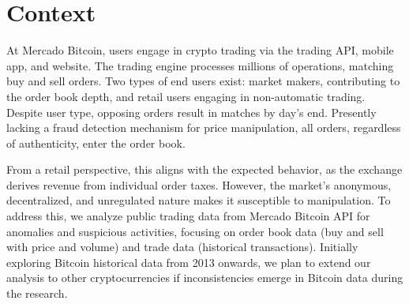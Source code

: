 \section{Context}
At Mercado Bitcoin, users engage in crypto trading via the trading API, mobile app, and website. The trading engine
processes millions of operations, matching buy and sell orders. Two types of end users exist: market makers,
contributing to the order book depth, and retail users engaging in non-automatic trading. Despite user type, opposing
orders result in matches by day's end. Presently lacking a fraud detection mechanism for price manipulation, all orders,
regardless of authenticity, enter the order book.

From a retail perspective, this aligns with the expected behavior, as the exchange derives revenue from individual order
taxes. However, the market's anonymous, decentralized, and unregulated nature makes it susceptible to manipulation. To
address this, we analyze public trading data from Mercado Bitcoin API for anomalies and suspicious activities, focusing
on order book data (buy and sell with price and volume) and trade data (historical transactions). Initially exploring
Bitcoin historical data from 2013 onwards, we plan to extend our analysis to other cryptocurrencies if inconsistencies
emerge in Bitcoin data during the research.